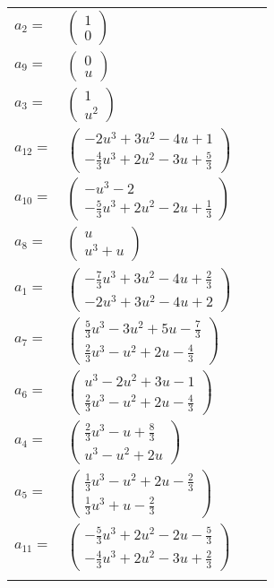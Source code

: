 \documentclass[1p]{elsarticle_modified}
\theoremstyle{definition}
\begin{document}
\begin{tabular}{m{7pt} m{180pt} m{7pt} m{180pt} }
\flushright $a_{2}=$&$\begin{pmatrix}1\\0\end{pmatrix}$ \\
\flushright $a_{9}=$&$\begin{pmatrix}0\\u\end{pmatrix}$ \\
\flushright $a_{3}=$&$\begin{pmatrix}1\\u^2\end{pmatrix}$ \\
\flushright $a_{12}=$&$\begin{pmatrix}-2 u^3+3 u^2-4 u+1\\-\frac{4}{3} u^3+2 u^2-3 u+\frac{5}{3}\end{pmatrix}$ \\
\flushright $a_{10}=$&$\begin{pmatrix}- u^3-2\\-\frac{5}{3} u^3+2 u^2-2 u+\frac{1}{3}\end{pmatrix}$ \\
\flushright $a_{8}=$&$\begin{pmatrix}u\\u^3+u\end{pmatrix}$ \\
\flushright $a_{1}=$&$\begin{pmatrix}-\frac{7}{3} u^3+3 u^2-4 u+\frac{2}{3}\\-2 u^3+3 u^2-4 u+2\end{pmatrix}$ \\
\flushright $a_{7}=$&$\begin{pmatrix}\frac{5}{3} u^3-3 u^2+5 u-\frac{7}{3}\\\frac{2}{3} u^3- u^2+2 u-\frac{4}{3}\end{pmatrix}$ \\
\flushright $a_{6}=$&$\begin{pmatrix}u^3-2 u^2+3 u-1\\\frac{2}{3} u^3- u^2+2 u-\frac{4}{3}\end{pmatrix}$ \\
\flushright $a_{4}=$&$\begin{pmatrix}\frac{2}{3} u^3- u+\frac{8}{3}\\u^3- u^2+2 u\end{pmatrix}$ \\
\flushright $a_{5}=$&$\begin{pmatrix}\frac{1}{3} u^3- u^2+2 u-\frac{2}{3}\\\frac{1}{3} u^3+u-\frac{2}{3}\end{pmatrix}$ \\
\flushright $a_{11}=$&$\begin{pmatrix}-\frac{5}{3} u^3+2 u^2-2 u-\frac{5}{3}\\-\frac{4}{3} u^3+2 u^2-3 u+\frac{2}{3}\end{pmatrix}$\\&\end{tabular}
\end{document}
